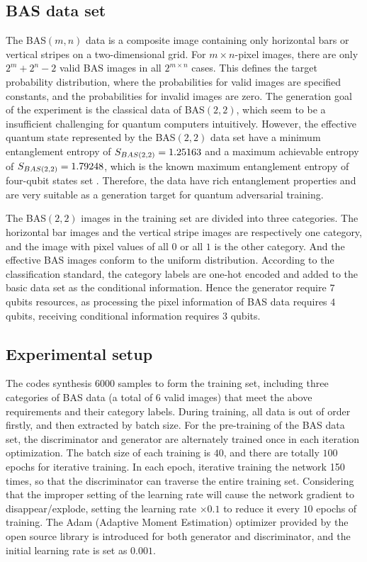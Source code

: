 \documentclass{bmcart}
\begin{document}
\subsection{BAS data set}
The BAS$(m,n)$ data is a composite image containing only horizontal bars or vertical stripes on a two-dimensional grid. For $m \times n$-pixel images, there are only ${2^m} + {2^n} - 2$ valid BAS images in all ${2^{m \times n}}$ cases. This defines the target probability distribution, where the probabilities for valid images are specified constants, and the probabilities for invalid images are zero. The generation goal of the experiment is the classical data of BAS$(2, 2)$, which seem to be a insufficient challenging for quantum computers intuitively. However, the effective quantum state represented by the BAS$(2,2)$ data set have a minimum entanglement entropy of ${S_{BAS\left( {2,2} \right)}} = {\rm{1}}{\rm{.25163}}$ and a maximum achievable entropy of ${S_{BAS\left( {2,2} \right)}} = {\rm{1}}.{\rm{79248}}$, which is the known maximum entanglement entropy of four-qubit states set \cite{Higu}. Therefore, the data have rich entanglement properties and are very suitable as a generation target for quantum adversarial training.


The BAS$(2,2)$ images in the training set are divided into three categories. The horizontal bar images and the vertical stripe images are respectively one category, and the image with pixel values of all $0$ or all $1$ is the other category. And the effective BAS images conform to the uniform distribution. According to the classification standard, the category labels are one-hot encoded and added to the basic data set as the conditional information. Hence the generator require $7$ qubits resources, as processing the pixel information of BAS data requires $4$ qubits, receiving conditional information requires $3$ qubits.


\subsection{Experimental setup}
The codes synthesis $6000$ samples to form the training set, including three categories of BAS data (a total of $6$ valid images) that meet the above requirements and their category labels. During training, all data is out of order firstly, and then extracted by batch size. For the pre-training of the BAS data set, the discriminator and generator are alternately trained once in each iteration optimization. The batch size of each training is $40$, and there are totally $100$ epochs for iterative training. In each epoch, iterative training the network 150 times, so that the discriminator can traverse the entire training set. Considering that the improper setting of the learning rate will cause the network gradient to disappear/explode, setting the learning rate $\times 0.1$ to reduce it every $10$ epochs of training. The Adam (Adaptive Moment
Estimation) optimizer provided by the open source library is introduced for both generator and discriminator, and the initial learning rate is set as $0.001$.
\end{document}
